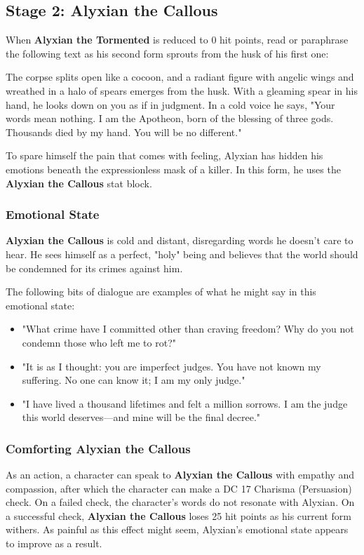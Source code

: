 \documentclass[10pt,a4paper,twoside,fancy,bg=print,twocolumn,openany,nodeprecatedcode]{dndbook}
\begin{document}
\subsection{Stage 2: Alyxian the Callous}
When \textbf{Alyxian the Tormented} is reduced to 0 hit points, read or paraphrase the following text as his second form sprouts from the husk of his first one:

\begin{DndReadAloud}{}
The corpse splits open like a cocoon, and a radiant figure with angelic wings and wreathed in a halo of spears emerges from the husk. With a gleaming spear in his hand, he looks down on you as if in judgment. In a cold voice he says, "Your words mean nothing. I am the Apotheon, born of the blessing of three gods. Thousands died by my hand. You will be no different."

\end{DndReadAloud}

To spare himself the pain that comes with feeling, Alyxian has hidden his emotions beneath the expressionless mask of a killer. In this form, he uses the \textbf{Alyxian the Callous} stat block.

\subsubsection{Emotional State}
\textbf{Alyxian the Callous} is cold and distant, disregarding words he doesn't care to hear. He sees himself as a perfect, "holy" being and believes that the world should be condemned for its crimes against him.

The following bits of dialogue are examples of what he might say in this emotional state:


\begin{itemize}
\item "What crime have I committed other than craving freedom? Why do you not condemn those who left me to rot?"
\item "It is as I thought: you are imperfect judges. You have not known my suffering. No one can know it; I am my only judge."
\item "I have lived a thousand lifetimes and felt a million sorrows. I am the judge this world deserves—and mine will be the final decree."
\end{itemize}

\subsubsection{Comforting Alyxian the Callous}
As an action, a character can speak to \textbf{Alyxian the Callous} with empathy and compassion, after which the character can make a DC 17 Charisma (Persuasion) check. On a failed check, the character's words do not resonate with Alyxian. On a successful check, \textbf{Alyxian the Callous} loses 25 hit points as his current form withers. As painful as this effect might seem, Alyxian's emotional state appears to improve as a result.
\end{document}
